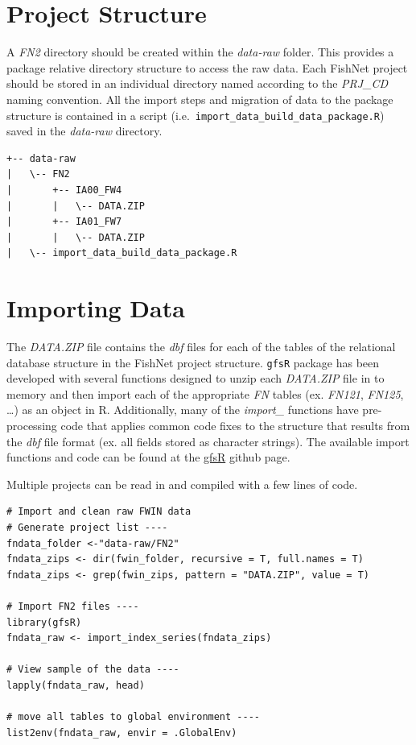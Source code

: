 \documentclass[
]{book}
\begin{document}
\hypertarget{project-structure}{%
\section{Project Structure}\label{project-structure}}

A \emph{FN2} directory should be created within the \emph{data-raw} folder. This provides a package relative directory structure to access the raw data. Each FishNet project should be stored in an individual directory named according to the \emph{PRJ\_CD} naming convention. All the import steps and migration of data to the package structure is contained in a script (i.e.~\texttt{import\_data\_build\_data\_package.R}) saved in the \emph{data-raw} directory.

\begin{verbatim}
+-- data-raw
|   \-- FN2
|       +-- IA00_FW4
|       |   \-- DATA.ZIP
|       +-- IA01_FW7
|       |   \-- DATA.ZIP
|   \-- import_data_build_data_package.R
\end{verbatim}

\hypertarget{importing-data}{%
\section{Importing Data}\label{importing-data}}

The \emph{DATA.ZIP} file contains the \emph{dbf} files for each of the tables of the relational database structure in the FishNet project structure. \texttt{gfsR} package has been developed with several functions designed to unzip each \emph{DATA.ZIP} file in to memory and then import each of the appropriate \emph{FN} tables (ex. \emph{FN121}, \emph{FN125}, \ldots) as an object in R. Additionally, many of the \emph{import\_} functions have pre-processing code that applies common code fixes to the structure that results from the \emph{dbf} file format (ex. all fields stored as character strings). The available import functions and code can be found at the \href{https://github.com/HoldenJe/gfsR}{gfsR} github page.

Multiple projects can be read in and compiled with a few lines of code.

\begin{verbatim}
# Import and clean raw FWIN data
# Generate project list ----
fndata_folder <-"data-raw/FN2"
fndata_zips <- dir(fwin_folder, recursive = T, full.names = T)
fndata_zips <- grep(fwin_zips, pattern = "DATA.ZIP", value = T)

# Import FN2 files ----
library(gfsR)
fndata_raw <- import_index_series(fndata_zips)

# View sample of the data ----
lapply(fndata_raw, head)

# move all tables to global environment ----
list2env(fndata_raw, envir = .GlobalEnv)
\end{verbatim}
\end{document}
